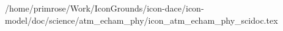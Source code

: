 /home/primrose/Work/IconGrounds/icon-dace/icon-model/doc/science/atm_echam_phy/icon_atm_echam_phy_scidoc.tex
